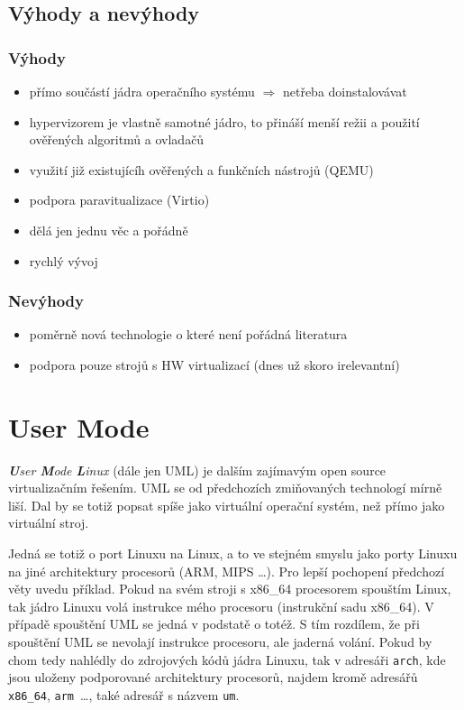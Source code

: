 \subsection{Výhody a nevýhody}
\subsubsection{Výhody}
\begin{itemize}
  \item přímo součástí jádra operačního systému $\Rightarrow$ netřeba doinstalovávat
  \item hypervizorem je vlastně samotné jádro, to přináší menší režii a použití ověřených algoritmů a ovladačů
  \item využití již existujícíh ověřených a funkčních nástrojů (QEMU)
  \item podpora paravitualizace (Virtio)
  \item dělá jen jednu věc a pořádně
  \item rychlý vývoj
\end{itemize}
\subsubsection{Nevýhody}
\begin{itemize}
  \item poměrně nová technologie o které není pořádná literatura
  \item podpora pouze strojů s HW virtualizací (dnes už skoro irelevantní)
\end{itemize}
\section{User Mode \linux}
\emph{\textbf{U}ser \textbf{M}ode \textbf{L}inux} (dále jen UML) je dalším zajímavým open source virtualizačním řešením. UML se od předchozích zmiňovaných technologí mírně liší. Dal by se totiž popsat spíše jako virtuální operační systém, než přímo jako virtuální stroj.

Jedná se totiž o port Linuxu na Linux, a to ve stejném smyslu jako porty Linuxu na jiné architektury procesorů (ARM, MIPS \dots). Pro lepší pochopení předchozí věty uvedu příklad. Pokud na svém stroji s x86\_64 procesorem spouštím Linux, tak jádro Linuxu volá instrukce mého procesoru (instrukční sadu x86\_64). V případě spouštění UML se jedná v podstatě o totéž. S tím rozdílem, že při spouštění UML se nevolají instrukce procesoru, ale jaderná volání. Pokud by chom tedy nahlédly do zdrojových kódů jádra Linuxu, tak v adresáři \texttt{arch}, kde jsou uloženy podporované architektury procesorů, najdem kromě adresářů \texttt{x86\_64}, \texttt{arm}~\dots, také adresář s názvem \texttt{um}.

